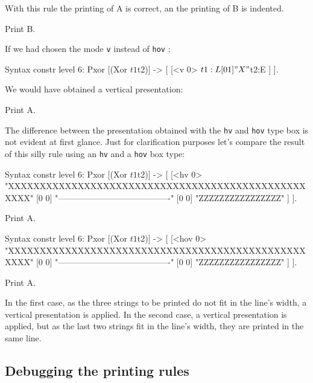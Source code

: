 {\begin{enumerate}
With this rule the printing of A is correct, an the printing of B is
indented.

\begin{coq_example}
Print B.
\end{coq_example}

If we had chosen the mode \verb+v+ instead of \verb+hov+ :

\begin{coq_example*}
Syntax constr level 6:
  Pxor [(Xor $t1 $t2)] -> [ [<v 0> $t1:L [0 1] " X " $t2:E ] ].
\end{coq_example*}

We would have obtained a vertical presentation:

\begin{coq_example}
Print A.
\end{coq_example}

The difference between the presentation obtained with the \verb+hv+
and \verb+hov+ type box is not evident at first glance. Just for
clarification purposes let's compare the result of this silly rule
using an \verb+hv+ and a \verb+hov+ box type:

\begin{coq_example*}
Syntax constr level 6:
  Pxor [(Xor $t1 $t2)] ->
   [ [<hv 0> "XXXXXXXXXXXXXXXXXXXXXXXXXXXXXXXXXXXXXXXXXXXXXXXXXXX"
       [0 0] "----------------------------------------"
       [0 0] "ZZZZZZZZZZZZZZZZ" ] ].
\end{coq_example*}
\begin{coq_example}
Print A.
\end{coq_example}
\begin{coq_example*}
Syntax constr level 6:
  Pxor [(Xor $t1 $t2)] ->
   [ [<hov 0> "XXXXXXXXXXXXXXXXXXXXXXXXXXXXXXXXXXXXXXXXXXXXXXXXXXX"
       [0 0]  "----------------------------------------"
       [0 0]  "ZZZZZZZZZZZZZZZZ" ] ].
\end{coq_example*}
\begin{coq_example}
Print A.
\end{coq_example}

In the first case, as the three strings to be printed do not fit in
the line's width, a vertical presentation is applied. In the second
case, a vertical presentation is applied, but as the last two strings
fit in the line's width, they are printed in the same line.


\end{enumerate}

\subsection{Debugging the printing rules}

}
